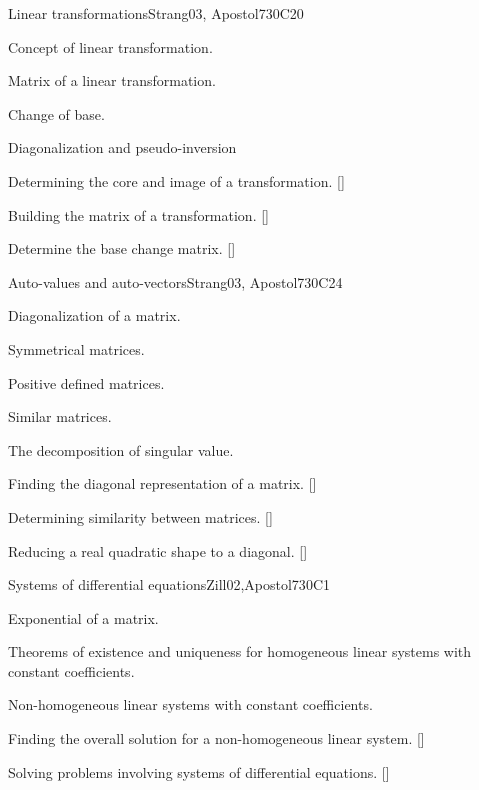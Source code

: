 \begin{syllabus}
\begin{unit}{}{Linear transformations}{Strang03, Apostol73}{0}{C20}
\begin{topics}
      \item Concept of linear transformation.
      \item Matrix of a linear transformation.
      \item Change of base.
      \item Diagonalization and pseudo-inversion
   \end{topics}
   \begin{learningoutcomes}
      \item Determining the core and image of a transformation. [\Usage]
      \item Building the matrix of a transformation. [\Usage]
      \item Determine the base change matrix. [\Usage]
      \end{learningoutcomes}
\end{unit}

\begin{unit}{}{Auto-values and auto-vectors}{Strang03, Apostol73}{0}{C24}
\begin{topics}
      \item Diagonalization of a matrix.
      \item Symmetrical matrices.
      \item Positive defined matrices.
      \item Similar matrices.
      \item The decomposition of singular value.
  \end{topics}
 \begin{learningoutcomes}
      \item Finding the diagonal representation of a matrix. [\Usage]
      \item Determining similarity between matrices. [\Usage]
      \item Reducing a real quadratic shape to a diagonal. [\Usage]
   \end{learningoutcomes}
\end{unit}

\begin{unit}{}{Systems of differential equations}{Zill02,Apostol73}{0}{C1}
\begin{topics}
      \item Exponential of a matrix.
      \item Theorems of existence and uniqueness for homogeneous linear systems with constant coefficients.
      \item Non-homogeneous linear systems with constant coefficients.
   \end{topics}
\begin{learningoutcomes}
      \item Finding the overall solution for a non-homogeneous linear system. [\Usage]
      \item Solving problems involving systems of differential equations. [\Usage]
   \end{learningoutcomes}
\end{unit}


\end{syllabus}
